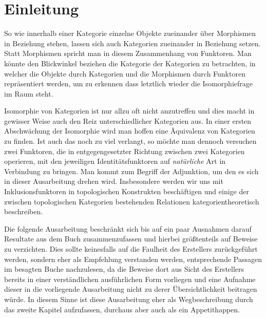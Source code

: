 \section*{Einleitung}

So wie innerhalb einer Kategorie einzelne Objekte zueinander über Morphismen in Beziehung stehen, lassen sich auch Kategorien zueinander in Beziehung setzen. Statt Morphismen spricht man in diesem Zusammenhang von Funktoren. Man könnte den Blickwinkel beziehen die Kategorie der Kategorien zu betrachten, in welcher die Objekte durch Kategorien und die Morphismen durch Funktoren repräsentiert werden, um zu erkennen dass letztlich wieder die Isomorphiefrage im Raum steht.

Isomorphie von Kategorien ist nur allzu oft nicht anzutreffen und dies macht in gewisser Weise auch den Reiz unterschiedlicher Kategorien aus. In einer ersten Abschwächung der Isomorphie wird man hoffen eine Äquivalenz von Kategorien zu finden. Ist auch das noch zu viel verlangt, so möchte man dennoch versuchen zwei Funktoren, die in entgegengesetzter Richtung zwischen zwei Kategorien operieren, mit den jeweiligen Identitätsfunktoren auf \emph{natürliche} Art in Verbindung zu bringen. Man kommt zum Begriff der Adjunktion, um den es sich in dieser Ausarbeitung drehen wird. Insbesondere werden wir uns mit Inklusionsfunktoren in topologischen Konstrukten beschäftigen und einige der zwischen topologischen Kategorien bestehenden Relationen kategorientheoretisch beschreiben.

Die folgende Ausarbeitung beschränkt sich bis auf ein paar Ausnahmen darauf Resultate aus dem Buch \cite{preuss} zusammenzufassen und hierbei größtenteils auf Beweise zu verzichten. 
Dies sollte keinesfalls auf die Faulheit des Erstellers zurückgeführt werden, sondern eher als Empfehlung verstanden werden, entsprechende Passagen im besagten Buche nachzulesen, da die Beweise dort aus Sicht des Erstellers bereits in einer verständlichen ausführlichen Form vorliegen und eine Aufnahme dieser in die vorliegende Ausarbeitung nicht zu derer Übersichtlichkeit beitragen würde.
In diesem Sinne ist diese Ausarbeitung eher als Wegbeschreibung durch das zweite Kapitel aufzufassen, durchaus aber auch als ein Appetithappen.
